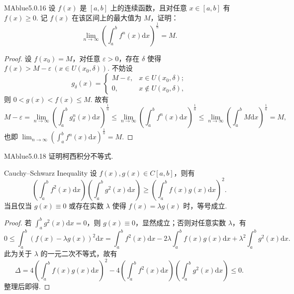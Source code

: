 \begin{problem}{MAblue}{5.0.16}
    设 $f(x)$ 是 $[a, b]$ 上的连续函数，且对任意 $x \in [a, b]$ 有 $f(x) \geqslant 0$. 记 $f(x)$ 在该区间上的最大值为 $M$，证明：
    \[
        \lim_{n \to \infty} \left( \int_a^b f^n(x) \mathrm dx \right)^{\frac 1 n} = M.
    \]
\end{problem}

\begin{proof}
    设 $f(x_0) = M$，对任意 $\varepsilon > 0$，存在 $\delta$ 使得 $f(x) > M - \varepsilon \ \left(x \in U(x_0, \delta) \right)$. 不妨设
    \[
        g_\delta(x) =
        \begin{cases}
            M - \varepsilon, & x \in U(x_0, \delta); \\
            0, & x \not\in U(x_0, \delta),
        \end{cases}
    \]
    则 $0 < g(x) < f(x) \leqslant M$. 故有
    \[
        M - \varepsilon = \lim_{n \to \infty} \left( \int_a^b g_\delta^n(x) \mathrm dx \right)^{\frac 1 n} \leqslant \lim_{n \to \infty} \left( \int_a^b f^n(x) \mathrm dx \right)^{\frac 1 n} \leqslant \lim_{n \to \infty} \left( \int_a^b M \mathrm dx \right)^{\frac 1 n} = M,
    \]
    也即 $\lim_{n \to \infty} \left( \int_a^b f^n(x) \mathrm dx \right)^{\frac 1 n} = M$.
\end{proof}

\begin{problem}{MAblue}{5.0.18}
    证明柯西积分不等式.
\end{problem}

\begin{center}
    \begin{minipage}{0.85\textwidth}
        \begin{theorem}{Cauchy–Schwarz Inequality}{}
            设 $f(x), g(x) \in C[a, b]$，则有
            \[
                \left( \int_a^b f^2(x) \mathrm dx \right) \left( \int_a^b g^2(x) \mathrm dx \right) \geqslant \left( \int_a^b f(x)g(x) \mathrm dx \right)^2.
            \]
            当且仅当 $g(x) \equiv 0$ 或存在实数 $\lambda$ 使得 $f(x) = \lambda g(x)$ 时，等号成立.
        \end{theorem}
    \end{minipage}
\end{center}

\begin{proof}
    若 $\int_a^b g^2(x) \mathrm dx = 0$，则 $g(x) \equiv 0$，显然成立；否则对任意实数 $\lambda$，有
    \[
        0 \leqslant \int_a^b \left( f(x) - \lambda g(x) \right)^2 \mathrm dx = \int_a^b f^2(x) \mathrm dx - 2\lambda \int_a^b f(x)g(x) \mathrm dx + \lambda^2 \int_a^b g^2(x) \mathrm dx.
    \]
    此为关于 $\lambda$ 的一元二次不等式，故有
    \[
        \Delta = 4 \left( \int_a^b f(x)g(x) \mathrm dx \right)^2 - 4 \left( \int_a^b f^2(x) \mathrm dx \right) \left( \int_a^b g^2(x) \mathrm dx \right) \leqslant 0.
    \]
    整理后即得.
\end{proof}

